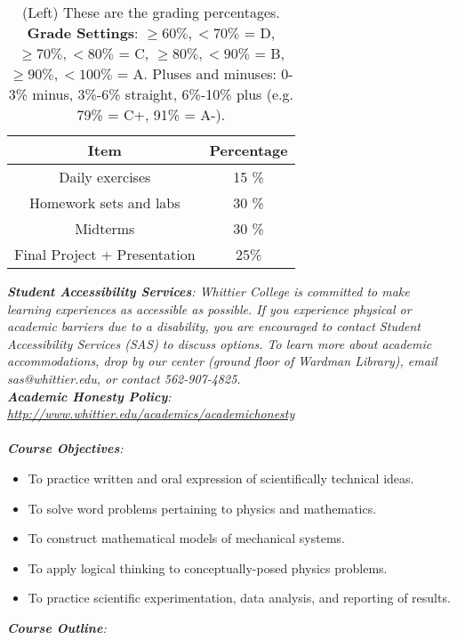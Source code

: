 \documentclass[10pt]{article}
\begin{document}
\begin{table}[h]
\small
\centering
\begin{tabular}{| c | c |}
\hline
Item & Percentage \\ \hline \hline
Daily exercises & 15 \% \\ \hline
Homework sets and labs & 30 \% \\ \hline
Midterms & 30 \% \\ \hline
Final Project + Presentation & 25\% \\ \hline
\end{tabular}
\caption{\label{tab:grades} (Left) These are the grading percentages. \textbf{Grade Settings}: $\geq 60\%, <70\%$ = D, $\geq 70\%, <80\%$ = C, $\geq 80\%, <90\%$ = B, $\geq 90\%, <100\%$ = A. Pluses and minuses: 0-3\% minus, 3\%-6\% straight, 6\%-10\% plus (e.g. 79\% = C+, 91\% = A-).}
\end{table}
\noindent
\textit{\textbf{Student Accessibility Services}: Whittier College is committed to make learning experiences as accessible as possible. If you experience physical or academic barriers due to a disability, you are encouraged to contact Student Accessibility Services (SAS) to discuss options. To learn more about academic accommodations, drop by our center (ground floor of Wardman Library), email sas@whittier.edu, or contact 562-907-4825.} \\
\textit{\textbf{Academic Honesty Policy}: \url{http://www.whittier.edu/academics/academichonesty}} \\ \\
\noindent
\textit{\textbf{Course Objectives}:}
\begin{itemize}
\item To practice written and oral expression of scientifically technical ideas.
\item To solve word problems pertaining to physics and mathematics.
\item To construct mathematical models of mechanical systems.
\item To apply logical thinking to conceptually-posed physics problems.
\item To practice scientific experimentation, data analysis, and reporting of results.
\end{itemize}
\noindent
\textit{\textbf{Course Outline}:}
\end{document}
